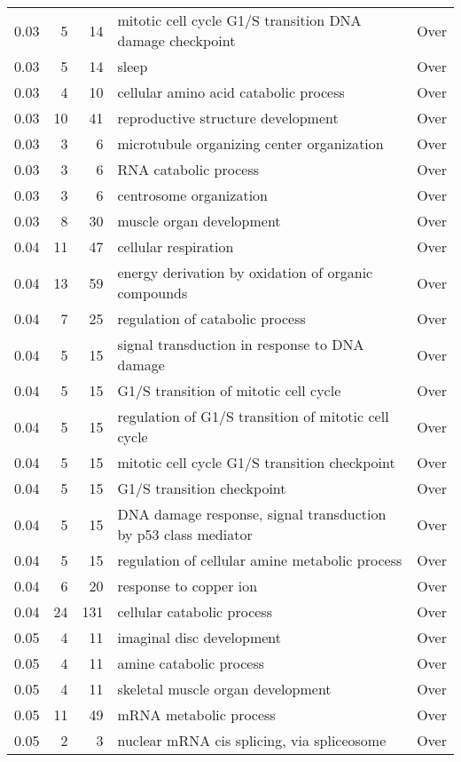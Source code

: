 \begin{longtable}{rrrp{7cm}r}
  0.03 &   5 &  14 & mitotic cell cycle G1/S transition DNA damage checkpoint & Over \\ 
  0.03 &   5 &  14 & sleep & Over \\ 
  0.03 &   4 &  10 & cellular amino acid catabolic process & Over \\ 
  0.03 &  10 &  41 & reproductive structure development & Over \\ 
  0.03 &   3 &   6 & microtubule organizing center organization & Over \\ 
  0.03 &   3 &   6 & RNA catabolic process & Over \\ 
  0.03 &   3 &   6 & centrosome organization & Over \\ 
  0.03 &   8 &  30 & muscle organ development & Over \\ 
  0.04 &  11 &  47 & cellular respiration & Over \\ 
  0.04 &  13 &  59 & energy derivation by oxidation of organic compounds & Over \\ 
  0.04 &   7 &  25 & regulation of catabolic process & Over \\ 
  0.04 &   5 &  15 & signal transduction in response to DNA damage & Over \\ 
  0.04 &   5 &  15 & G1/S transition of mitotic cell cycle & Over \\ 
  0.04 &   5 &  15 & regulation of G1/S transition of mitotic cell cycle & Over \\ 
  0.04 &   5 &  15 & mitotic cell cycle G1/S transition checkpoint & Over \\ 
  0.04 &   5 &  15 & G1/S transition checkpoint & Over \\ 
  0.04 &   5 &  15 & DNA damage response, signal transduction by p53 class mediator & Over \\ 
  0.04 &   5 &  15 & regulation of cellular amine metabolic process & Over \\ 
  0.04 &   6 &  20 & response to copper ion & Over \\ 
  0.04 &  24 & 131 & cellular catabolic process & Over \\ 
  0.05 &   4 &  11 & imaginal disc development & Over \\ 
  0.05 &   4 &  11 & amine catabolic process & Over \\ 
  0.05 &   4 &  11 & skeletal muscle organ development & Over \\ 
  0.05 &  11 &  49 & mRNA metabolic process & Over \\ 
  0.05 &   2 &   3 & nuclear mRNA cis splicing, via spliceosome & Over \\ 

\end{longtable}
